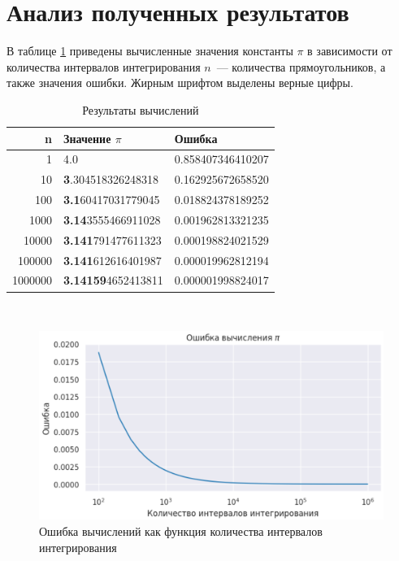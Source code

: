\documentclass[a4paper,12pt]{article}
\begin{document}
\section{Анализ полученных результатов}

В таблице \ref{table:results} приведены вычисленные значения константы $\pi$ в зависимости от количества интервалов интегрирования $n$~--- количества прямоугольников, а также значения ошибки. Жирным шрифтом выделены верные цифры.

\begin{table}[h!]
    \caption{Результаты вычислений\label{table:results}}
    \begin{center}
    \begin{tabular}{||r l l||} 
     \hline
     n & Значение $\pi$ & Ошибка \\ [0.5ex] 
     \hline\hline
     1       & 4.0                        & 0.858407346410207 \\ 
     \hline
     10      & \textbf{3}.304518326248318 & 0.162925672658520 \\
     \hline
     100     & \textbf{3.1}60417031779045 & 0.018824378189252 \\
     \hline
     1000    & \textbf{3.14}3555466911028 & 0.001962813321235 \\ 
     \hline
     10000   & \textbf{3.141}791477611323 & 0.000198824021529 \\ 
     \hline
     100000  & \textbf{3.141}612616401987 & 0.000019962812194 \\ 
     \hline
     1000000 & \textbf{3.14159}4652413811 & 0.000001998824017 \\ 
     \hline               
    \end{tabular}
    \end{center}
\end{table}

\begin{figure}[h]\
    \begin{center}
    \includegraphics[width=\textwidth]{error.png}    
    \caption{Ошибка вычислений как функция количества интервалов интегрирования}
    \label{fig:error}
    \end{center}
\end{figure}
\end{document}
